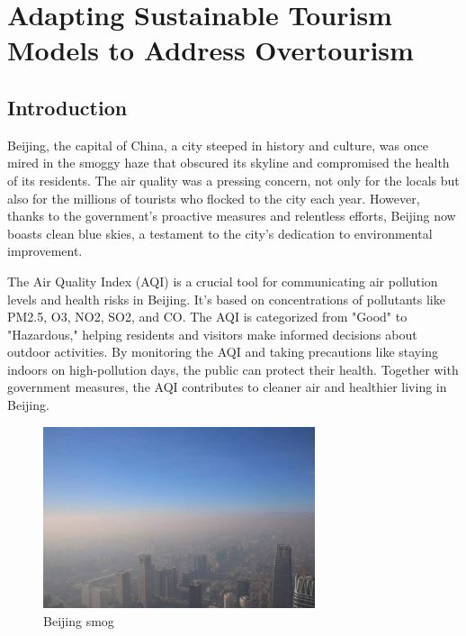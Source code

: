 \documentclass[UTF8]{mcmthesis}
\begin{document}
            

    \section{Adapting Sustainable Tourism Models to Address Overtourism}
            \subsection{Introduction}
            \hspace*{2em}Beijing, the capital of China, a city steeped in history and culture, was once mired in the smoggy haze that obscured its skyline and compromised the health of its residents. The air quality was a pressing concern, not only for the locals but also for the millions of tourists who flocked to the city each year. However, thanks to the government's proactive measures and relentless efforts, Beijing now boasts clean blue skies, a testament to the city's dedication to environmental improvement.
                        
            The Air Quality Index (AQI) is a crucial tool for communicating air pollution levels and health risks in Beijing. It's based on concentrations of pollutants like PM2.5, O3, NO2, SO2, and CO. The AQI is categorized from "Good" to "Hazardous," helping residents and visitors make informed decisions about outdoor activities. By monitoring the AQI and taking precautions like staying indoors on high-pollution days, the public can protect their health. Together with government measures, the AQI contributes to cleaner air and healthier living in Beijing.

            \begin{figure}[htbp]
                \centering
                \includegraphics[width=8cm]{smog.png}
                \caption{Beijing smog}
            \end{figure}
\end{document}
